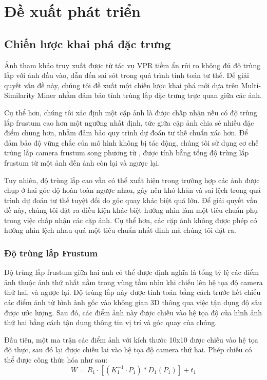 \section{Đề xuất phát triển}

\subsection{Chiến lược khai phá đặc trưng}

Ảnh tham khảo truy xuất được từ tác vụ VPR tiềm ẩn rủi ro không đủ độ trùng lắp với ảnh đầu vào, dẫn đến sai sót trong quá trình tính toán tư thế. Để giải quyết vấn đề này, chúng tôi đề xuất một chiến lược khai phá mới dựa trên Multi-Similarity Miner \cite{wang2019multi} nhằm đảm bảo tính trùng lắp đặc trưng trực quan giữa các ảnh. 

Cụ thể hơn, chúng tôi xác định một cặp ảnh là được chấp nhận nếu có độ trùng lắp frustum cao hơn một ngưỡng nhất định, tức giữa cặp ảnh chia sẻ nhiều đặc điểm chung hơn, nhằm đảm bảo quy trình dự đoán tư thế chuẩn xác hơn. Để đảm bảo độ vững chắc của mô hình không bị tác động, chúng tôi sử dụng cơ chế trùng lắp camera frustum song phương từ \cite{9008579}, được tính bằng tổng độ trùng lắp frustum từ một ảnh đến ảnh còn lại và ngược lại.

Tuy nhiên, độ trùng lắp cao vẫn có thể xuất hiện trong trường hợp các ảnh được chụp ở hai góc độ hoàn toàn ngược nhau, gây nên khó khăn và sai lệch trong quá trình dự đoán tư thế tuyệt đối do góc quay khác biệt quá lớn. Để giải quyết vấn đề này, chúng tôi đặt ra điều kiện khác biệt hướng nhìn làm một tiêu chuẩn phụ trong việc chấp nhận các cặp ảnh. Cụ thể hơn, các cặp ảnh không được phép có hướng nhìn lệch nhau quá một tiêu chuẩn nhất định mà chúng tôi đặt ra.

\subsubsection*{Độ trùng lắp Frustum}

Độ trùng lắp frustum giữa hai ảnh có thể được định nghĩa là tổng tỷ lệ các điểm ảnh thuộc ảnh thứ nhất nằm trong vùng tầm nhìn khi chiếu lên hệ tọa độ camera thứ hai, và ngược lại. Độ trùng lắp này được tính toán bằng cách trước hết chiếu các điểm ảnh từ hình ảnh gốc vào không gian 3D thông qua việc tận dụng độ sâu được ước lượng. Sau đó, các điểm ảnh này được chiếu vào hệ tọa độ của hình ảnh thứ hai bằng cách tận dụng thông tin vị trí và góc quay của chúng.

Đầu tiên, một ma trận các điểm ảnh với kích thước 10x10 được chiếu vào hệ tọa độ thực, sau đó lại được chiếu lại vào hệ tọa độ camera thứ hai. Phép chiếu có thể được công thức hóa như sau:
$$
W = R_1\cdot \left[(K_1^{-1} \cdot P_1)*D_1(P_1)\right] + t_1
$$

